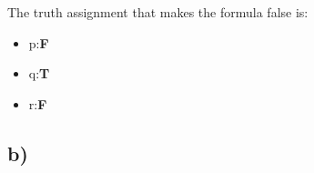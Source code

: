 \begin{center}
\begin{tikzpicture}
\end{tikzpicture}
\end{center}


The truth assignment that makes the formula false is:
\begin{itemize}
\item
p:\;\textbf{F}
\item
q:\;\textbf{T}
\item
r:\;\textbf{F}
\end{itemize}


\subsection{b)}

\begin{center}
\begin{tikzpicture}


\end{tikzpicture}
\end{center}

